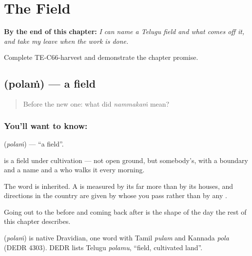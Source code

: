 
\chapter{The Field}
\label{ch:te-the-field}

\begin{chapteropening}
\textbf{By the end of this chapter:} \emph{I can name a Telugu field and what comes off it, and take my leave when the work is done.}

Complete TE-C66-harvest and demonstrate the chapter promise.
\end{chapteropening}

\section[\texorpdfstring{\te{పొలం} (polaṁ)}{పొలం (polaṁ)}]{ (polaṁ) — a field}

\label{lesson:TE-C66-field}



\begin{quote}
Before the new one: what did \emph{nammakaṁ} mean?
\end{quote}

\subsection*{You'll want to know: }
\textbf{} (\emph{polaṁ}) — \textquotedblleft{}a field\textquotedblright{}.

 is a field under cultivation — not open ground, but somebody's, with a boundary and a name and a  who walks it every morning.

The word is inherited. A  is measured by its  far more than by its houses, and directions in the country are given by whose  you pass rather than by any .

Going out to the  before  and coming back after  is the shape of the day the rest of this chapter describes.

\begin{cousinweb}
\textbf{} (\emph{polaṁ}) is native Dravidian, one word with Tamil \emph{pulam} and Kannada \emph{pola} (DEDR 4303). DEDR lists Telugu \emph{polamu}, \textquotedblleft{}field, cultivated land\textquotedblright{}.
\end{cousinweb}

